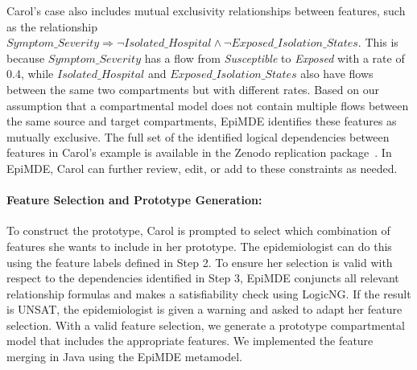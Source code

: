 Carol's case also includes mutual exclusivity relationships between features, such as the relationship
$Symptom\_Severity \Rightarrow \neg{Isolated\_Hospital} \land \neg{Exposed\_Isolation\_States}$. 
This is because $Symptom\_Severity$ has a flow from \textit{Susceptible} to \textit{Exposed} with a rate of 0.4, 
while $Isolated\_Hospital$ and $Exposed\_Isolation\_States$ also have flows between the same two compartments but with different rates. 
Based on our assumption that a compartmental model does not contain multiple flows between the same source and target compartments, 
EpiMDE identifies these features as mutually exclusive. 
The full set of the identified logical dependencies between features in Carol's example is available in the Zenodo replication package~\cite{zenodo_17806440}. 
In EpiMDE, Carol can further review, edit, or add to these constraints as needed. 




\paragraph{Feature Selection and Prototype Generation:} %
To construct the prototype, Carol is prompted to select which combination of features she wants to include in her prototype.
The epidemiologist can do this using the feature labels defined in Step 2.
%
To ensure her selection is valid with respect to the dependencies identified in Step 3, 
EpiMDE conjuncts all relevant relationship formulas and makes a satisfiability check using LogicNG. 
If the result is UNSAT, the epidemiologist is given a warning and asked to adapt her feature selection.
With a valid feature selection, we generate a prototype compartmental model that includes the appropriate features.
We implemented the feature merging in Java using the EpiMDE metamodel.

